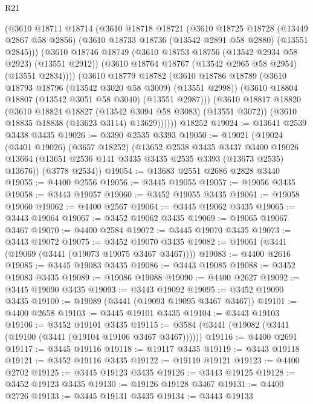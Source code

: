 \begin{lexlean}{R21}
\begin{coremodule}
        (@3610
          @18711
          @18714
          (@3610
            @18718
            @18721
            (@3610
              @18725
              @18728
              (@13449 @2867 @58 @2856)
              (@3610 @18733 @18736 (@13542 @2891 @58 @2880) (@13551 @2845)))
            (@3610
              @18746
              @18749
              (@3610 @18753 @18756 (@13542 @2934 @58 @2923) (@13551 @2912))
              (@3610 @18764 @18767 (@13542 @2965 @58 @2954) (@13551 @2834))))
          (@3610
            @18779
            @18782
            (@3610
              @18786
              @18789
              (@3610 @18793 @18796 (@13542 @3020 @58 @3009) (@13551 @2998))
              (@3610 @18804 @18807 (@13542 @3051 @58 @3040) (@13551 @2987)))
            (@3610
              @18817
              @18820
              (@3610 @18824 @18827 (@13542 @3094 @58 @3083) (@13551 @3072))
              (@3610 @18835 @18838 (@13623 @3114) @13629))))))
    @18252
@19024 := @13641 @2539 @3438 @3435
@19026 := @3390 @2535 @3393
@19050 := @19021
    (@19024
      (@3401 @19026)
      (@3657 @18252)
      (@13652
        @2538
        @3435
        @3437
        @3400
        @19026
        @13664
        (@13651 @2536 @141 @3435 @3435 @2535 @3393 (@13673 @2535) @13676))
      (@3778 @2534))
@19054 := @13683 @2551 @2686 @2828 @3440
@19055 := @4400 @2556
@19056 := @3445 @19055
@19057 := @19056 @3435
@19058 := @3443 @19057
@19060 := @3452 @19055 @3435
@19061 := @19058 @19060
@19062 := @4400 @2567
@19064 := @3445 @19062 @3435
@19065 := @3443 @19064
@19067 := @3452 @19062 @3435
@19069 := @19065 @19067 @3467
@19070 := @4400 @2584
@19072 := @3445 @19070 @3435
@19073 := @3443 @19072
@19075 := @3452 @19070 @3435
@19082 := @19061 (@3441 (@19069 (@3441 (@19073 @19075 @3467 @3467))))
@19083 := @4400 @2616
@19085 := @3445 @19083 @3435
@19086 := @3443 @19085
@19088 := @3452 @19083 @3435
@19089 := @19086 @19088
@19090 := @4400 @2627
@19092 := @3445 @19090 @3435
@19093 := @3443 @19092
@19095 := @3452 @19090 @3435
@19100 := @19089 (@3441 (@19093 @19095 @3467 @3467))
@19101 := @4400 @2658
@19103 := @3445 @19101 @3435
@19104 := @3443 @19103
@19106 := @3452 @19101 @3435
@19115 := @3584 (@3441 (@19082 (@3441 (@19100 (@3441 (@19104 @19106 @3467 @3467))))))
@19116 := @4400 @2691
@19117 := @3445 @19116
@19118 := @19117 @3435
@19119 := @3443 @19118
@19121 := @3452 @19116 @3435
@19122 := @19119 @19121
@19123 := @4400 @2702
@19125 := @3445 @19123 @3435
@19126 := @3443 @19125
@19128 := @3452 @19123 @3435
@19130 := @19126 @19128 @3467
@19131 := @4400 @2726
@19133 := @3445 @19131 @3435
@19134 := @3443 @19133

\end{coremodule}
\end{lexlean}
